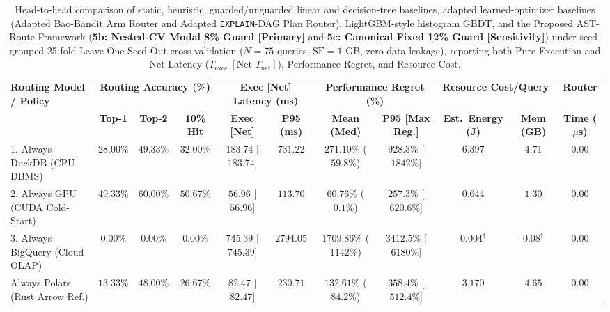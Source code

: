 \documentclass[10pt,a4paper]{article}
\newenvironment{fitasttable}{%
  \begin{lrbox}{\asttblbox}%
}{%
  \end{lrbox}%
  \sbox{\asttblboxB}{%
    \ifdim\wd\asttblbox>0.96\textwidth
      \resizebox{0.96\textwidth}{!}{\usebox{\asttblbox}}%
    \else
      \usebox{\asttblbox}%
    \fi
  }%
  \ifdim\ht\asttblboxB>0.72\textheight
    \resizebox{!}{0.72\textheight}{\usebox{\asttblboxB}}%
  \else
    \usebox{\asttblboxB}%
  \fi
}
\begin{document}
\begin{table}[!htbp]
\centering
\caption{Head-to-head comparison of static, heuristic, guarded/unguarded linear and decision-tree baselines, adapted learned-optimizer baselines (Adapted Bao-Bandit Arm Router and Adapted \texttt{EXPLAIN}-DAG Plan Router), LightGBM-style histogram GBDT, and the Proposed AST-Route Framework (\textbf{5b: Nested-CV Modal 8\% Guard [Primary]} and \textbf{5c: Canonical Fixed 12\% Guard [Sensitivity]}) under seed-grouped 25-fold Leave-One-Seed-Out cross-validation ($N=75$ queries, $\text{SF}=1\text{ GB}$, zero data leakage), reporting both Pure Execution and Net Latency ($T_{\text{exec}}\ [\text{Net } T_{\text{net}}]$), Performance Regret, and Resource Cost.}\label{tab:jbd_routing_t8}
\label{tab:routing_evaluation}\label{tab:query_routing}\label{tab:router_eval}
\scriptsize
\setlength{\tabcolsep}{2.7pt}
\renewcommand{\arraystretch}{1.07}
\begin{fitasttable}
\begin{tabular}{@{}lcccccccccc@{}}
\toprule
\multirow{2}{*}{\textbf{Routing Model / Policy}} & \multicolumn{3}{c}{\textbf{Routing Accuracy (\%)}} & \multicolumn{2}{c}{\textbf{Exec [Net] Latency (ms)}} & \multicolumn{2}{c}{\textbf{Performance Regret (\%)}} & \multicolumn{2}{c}{\textbf{Resource Cost/Query}} & \textbf{Router} \\
\cmidrule(lr){2-4} \cmidrule(lr){5-6} \cmidrule(lr){7-8} \cmidrule(lr){9-10} \cmidrule(lr){11-11}
 & \textbf{Top-1} & \textbf{Top-2} & \textbf{10\% Hit} & \textbf{Exec [Net]} & \textbf{P95 (ms)} & \textbf{Mean (Med)} & \textbf{P95 [Max Reg.]} & \textbf{Est.\ Energy (J)} & \textbf{Mem (GB)} & \textbf{Time ($\mu$s)} \\
\midrule
1. Always DuckDB (CPU DBMS) & $28.00\%$ & $49.33\%$ & $32.00\%$ & $183.74$ [$183.74$] & $731.22$ & $271.10\%$ ($59.8\%$) & $928.3\%$ [$1842\%$] & $6.397$ & $4.71$ & $0.00$ \\
2. Always GPU (CUDA Cold-Start) & $49.33\%$ & $60.00\%$ & $50.67\%$ & $56.96$ [$56.96$] & $113.70$ & $60.76\%$ ($0.1\%$) & $257.3\%$ [$620.6\%$] & $0.644$ & $1.30$ & $0.00$ \\
3. Always BigQuery (Cloud OLAP) & $0.00\%$ & $0.00\%$ & $0.00\%$ & $745.39$ [$745.39$] & $2794.05$ & $1709.86\%$ ($1142\%$) & $3412.5\%$ [$6180\%$] & $0.004^{\dagger}$ & $0.08^{\dagger}$ & $0.00$ \\
Always Polars (Rust Arrow Ref.) & $13.33\%$ & $48.00\%$ & $26.67\%$ & $82.47$ [$82.47$] & $230.71$ & $132.61\%$ ($84.2\%$) & $358.4\%$ [$512.4\%$] & $3.170$ & $4.65$ & $0.00$ \\

\end{tabular}
\end{fitasttable}
\end{table}
\end{document}
